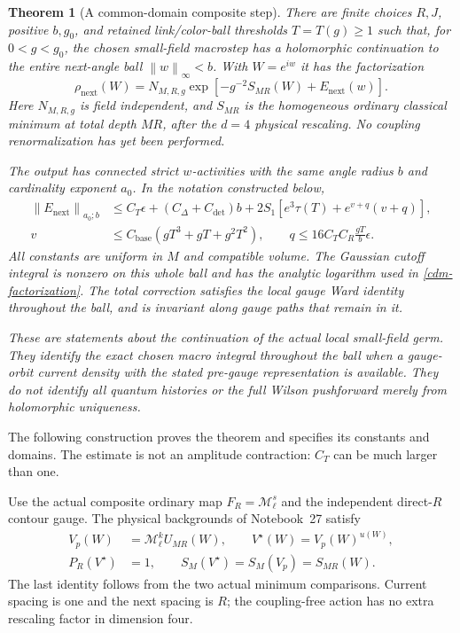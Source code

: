 \documentclass[11pt]{article}
\newtheorem{theorem}{Theorem}[section]
\theoremstyle{remark}
\newcommand{\norm}[1]{\left\|#1\right\|}
\begin{document}
\begin{theorem}[A common-domain composite step]
\label{cdm-theorem}
There are finite choices $R,J$, positive $b,g_0$, and retained
link/color-ball thresholds $T=T(g)\ge1$ such that, for
$0<g<g_0$, the chosen small-field macrostep has a holomorphic
continuation to the entire next-angle ball $\norm{w}_\infty<b$.
With $W=e^{iw}$ it has the factorization
\begin{equation}
 \rho_{\mathrm{next}}(W)=
 N_{M,R,g}\exp\left[-g^{-2}S_{MR}(W)+E_{\mathrm{next}}(w)\right].
 \label{cdm-factorization}
\end{equation}
Here $N_{M,R,g}$ is field independent, and $S_{MR}$ is the
homogeneous ordinary classical minimum at total depth $MR$,
after the $d=4$ physical rescaling. No coupling renormalization
has yet been performed.

The output has connected strict $w$-activities with the same
angle radius $b$ and cardinality exponent $a_0$. In the notation
constructed below,
\begin{align}
 \norm{E_{\mathrm{next}}}_{a_0;b}
 &\le C_T\epsilon+(C_\Delta+C_{\det})b
       +2S_1\left[e^3\tau(T)+e^{v+q}(v+q)\right],
 \label{cdm-output-bound}\\
 v&\le C_{\mathrm{base}}(gT^3+gT+g^2T^2),\qquad
 q\le16C_TC_R\frac{gT}{b}\epsilon .
 \label{cdm-small-factors}
\end{align}
All constants are uniform in $M$ and compatible volume. The
Gaussian cutoff integral is nonzero on this whole ball and has
the analytic logarithm used in \eqref{cdm-factorization}.
The total correction satisfies the local gauge Ward identity
throughout the ball, and is invariant along gauge paths that
remain in it.

These are statements about the continuation of the actual local
small-field germ. They identify the exact chosen macro integral
throughout the ball when a gauge-orbit current density with the
stated pre-gauge representation is available. They do not identify
all quantum histories or the full Wilson pushforward merely from
holomorphic uniqueness.
\end{theorem}

The following construction proves the theorem and specifies its
constants and domains. The estimate is not an amplitude
contraction: $C_T$ can be much larger than one.

Use the actual composite ordinary map
$F_R=\mathcal M_\ell^s$ and the independent direct-$R$ contour
gauge. The physical backgrounds of Notebook~27 satisfy
\begin{equation}
 \begin{aligned} V_p(W)&=\mathcal M_\ell^k U_{MR}(W),\qquad
 V^\star(W)=V_p(W)^{u(W)},\\
P_R(V^\star)&=1,
 \qquad S_M(V^\star)=S_M(V_p)=S_{MR}(W).
 \end{aligned}
\label{cdm-background}
\end{equation}
The last identity follows from the two actual minimum comparisons.
Current spacing is one and the next spacing is $R$; the
coupling-free action has no extra rescaling factor in dimension
four.
\end{document}
